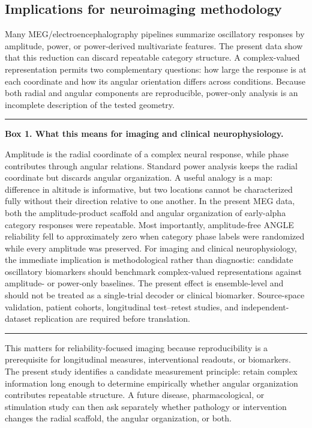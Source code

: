 \documentclass[11pt]{article}
\begin{document}
\subsection{Implications for neuroimaging methodology}
Many MEG/electroencephalography pipelines summarize oscillatory responses by amplitude, power, or power-derived multivariate features. The present data show that this reduction can discard repeatable category structure. A complex-valued representation permits two complementary questions: how large the response is at each coordinate and how its angular orientation differs across conditions. Because both radial and angular components are reproducible, power-only analysis is an incomplete description of the tested geometry.

\begin{center}
\begin{minipage}{0.93\linewidth}
\hrule\vspace{0.6em}
\textbf{Box 1. What this means for imaging and clinical neurophysiology.}\par
Amplitude is the radial coordinate of a complex neural response, while phase contributes through angular relations. Standard power analysis keeps the radial coordinate but discards angular organization. A useful analogy is a map: difference in altitude is informative, but two locations cannot be characterized fully without their direction relative to one another. In the present MEG data, both the amplitude-product scaffold and angular organization of early-alpha category responses were repeatable. Most importantly, amplitude-free ANGLE reliability fell to approximately zero when category phase labels were randomized while every amplitude was preserved. For imaging and clinical neurophysiology, the immediate implication is methodological rather than diagnostic: candidate oscillatory biomarkers should benchmark complex-valued representations against amplitude- or power-only baselines. The present effect is ensemble-level and should not be treated as a single-trial decoder or clinical biomarker. Source-space validation, patient cohorts, longitudinal test--retest studies, and independent-dataset replication are required before translation.
\vspace{0.6em}\hrule
\end{minipage}
\end{center}

This matters for reliability-focused imaging because reproducibility is a prerequisite for longitudinal measures, interventional readouts, or biomarkers. The present study identifies a candidate measurement principle: retain complex information long enough to determine empirically whether angular organization contributes repeatable structure. A future disease, pharmacological, or stimulation study can then ask separately whether pathology or intervention changes the radial scaffold, the angular organization, or both.
\end{document}
